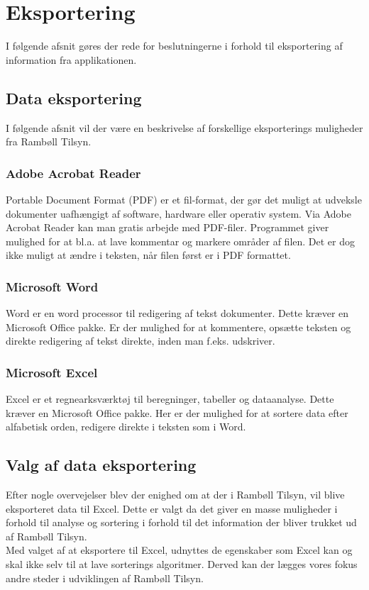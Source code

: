 \section{Eksportering}                                   
I følgende afsnit gøres der rede for beslutningerne i forhold til eksportering af information fra applikationen.

\subsection{Data eksportering}
I følgende afsnit vil der være en beskrivelse af forskellige eksporterings muligheder fra Rambøll Tilsyn.

\subsubsection{Adobe Acrobat Reader}
Portable Document Format\cite{PDF} (PDF) er et fil-format, der gør det muligt at udveksle dokumenter uafhængigt af software, hardware eller operativ system.
Via Adobe Acrobat Reader\cite{AdobeReader} kan man gratis arbejde med PDF-filer. Programmet giver mulighed for at bl.a. at lave kommentar og markere områder af filen. Det er dog ikke muligt at ændre i teksten, når filen først er i PDF formattet.

\subsubsection{Microsoft Word}
Word\cite{Office} er en word processor\cite{WordProcessor} til redigering af tekst dokumenter.
Dette kræver en Microsoft Office pakke. Er der mulighed for at kommentere, opsætte teksten og direkte redigering af tekst direkte, inden man f.eks. udskriver.

\subsubsection{Microsoft Excel}
Excel\cite{Office} er et regnearksværktøj til beregninger, tabeller og dataanalyse. 
Dette kræver en Microsoft Office pakke. Her er der mulighed for at sortere data efter alfabetisk orden, redigere direkte i teksten som i Word.

\subsection{Valg af data eksportering}
Efter nogle overvejelser blev der enighed om at der i Rambøll Tilsyn, vil blive eksporteret data til Excel. Dette er valgt da det giver en masse muligheder i forhold til analyse og sortering i forhold til det information der bliver trukket ud af Rambøll Tilsyn. \\
Med valget af at eksportere til Excel, udnyttes de egenskaber som Excel kan og skal ikke selv til at lave sorterings algoritmer. Derved kan der lægges vores fokus andre steder i udviklingen af Rambøll Tilsyn.